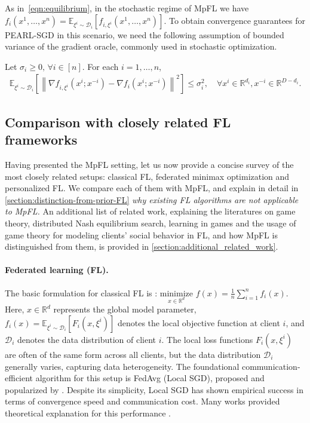 \documentclass{article}
\newcommand{\algname}[1]{{\color{PineGreen}\sf  #1}\xspace}
\newcommand{\cD}{{\mathcal{D}}}
\newcommand{\EE}{{\mathbb{E}}}
\newcommand{\reals}{\mathbb{R}}
\newcommand{\sqnorm}[1]{\left\| #1 \right\|^2}
\newcommand{\abbvname}{\algname{PEARL-SGD}}
\theoremstyle{plain}
\theoremstyle{remark}
\begin{document}
As in~\eqref{eqn:equilibrium}, in the stochastic regime of MpFL we have $f_i (x^1,\dots,x^n) = \EE_{\xi^i \sim \cD_i} \left[ f_{i,\xi^i} (x^1,\dots,x^n) \right]$. 
To obtain convergence guarantees for \abbvname in this scenario, we need the following assumption of bounded variance of the gradient oracle, commonly used in stochastic optimization.

\vspace{-5mm}

\noindent
\begin{assumption}
\label{assumption:noise}
    Let $\sigma_i \ge 0, \, \forall i\in [n]$. For each $i=1,\dots,n$,
    \begin{align*}
        \mathbb{E}_{\xi^i \sim \cD_i} \left[ \sqnorm{\nabla f_{i,\xi^i} (x^i; x^{-i}) - \nabla f_i (x^i; x^{-i})} \right] \le \sigma_i^2 , \quad \forall x^i \in \reals^{d_i}, x^{-i} \in \reals^{D-d_i} .
    \end{align*}
\end{assumption}

\subsection{Comparison with closely related FL frameworks}

Having presented the MpFL setting, let us now provide a concise survey of the most closely related setups: classical FL, federated minimax optimization and personalized FL.
We compare each of them with MpFL, and explain in detail in \cref{section:distinction-from-prior-FL} \emph{why existing FL algorithms are not applicable to MpFL.}
An additional list of related work, explaining the literatures on game theory, distributed Nash equilibrium search, learning in games and the usage of game theory for modeling clients' social behavior in FL, and how MpFL is distinguished from them, is provided in \cref{section:additional_related_work}.

\paragraph{Federated learning (FL).}
The basic formulation for classical FL is \citep{kairouz2021advances}: $\underset{x\in \reals^d}{\textrm{minimize}}  \,\,  f(x) = \frac{1}{n} \sum_{i=1}^n f_i(x)$.
Here, $x \in \reals^d$ represents the global model parameter, $f_i(x)= \mathbb{E}_{\xi^i \sim \cD_i} [F_i(x, \xi^i)]$ denotes the local objective function at client $i$, and $\cD_i$ denotes the data distribution of client $i$. The local loss
functions $F_i(x, \xi^i)$ are often of the same form across all clients, but the data distribution $\cD_i$ generally varies, capturing data heterogeneity. The foundational communication-efficient algorithm for this setup is FedAvg (Local SGD), proposed and popularized by \cite{McMahanMooreRamageHampsonArcas2017_communicationefficient}.
Despite its simplicity, Local SGD has shown empirical success in terms of convergence speed and communication cost.
Many works provided theoretical explanation for this performance \citep{Stich2019_local, DieuleveutPatel2019_communication, StichKarimireddy2020_errorfeedback, KhaledMishchenkoRichtarik2020_tighter}.
\end{document}
